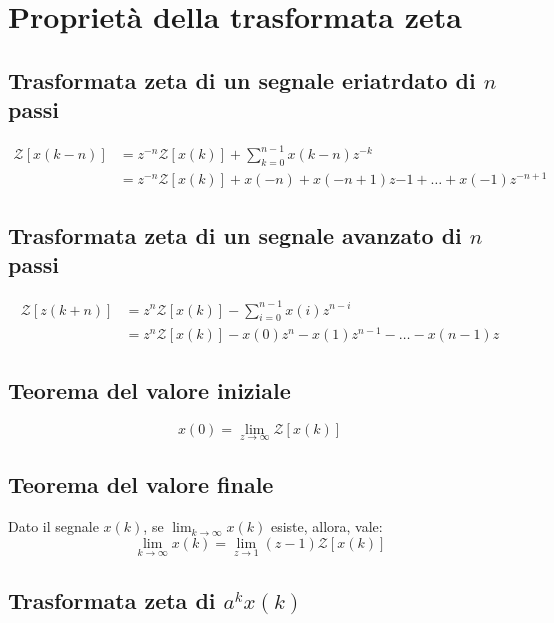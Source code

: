 \section{Proprietà della trasformata zeta}


\subsection{Trasformata zeta di un segnale eriatrdato di $n$ passi}

\begin{align}
  \mathcal{Z}[x(k - n)] &= z^{-n} \mathcal{Z}[x(k)] + \sum_{k=0}^{n-1} x(k-n) z^{-k} \\
  &= z^{-n} \mathcal{Z}[x(k)] + x(-n) + x(-n+1) z{-1} + \dots + x(-1) z^{-n+1}
\end{align}

\subsection{Trasformata zeta di un segnale avanzato di $n$ passi}

\begin{align}
  \mathcal{Z}[z(k + n)] &= z^{n} \mathcal{Z}[x(k)] - \sum_{i=0}^{n-1} x(i) z^{n-i} \\
  &= z^n \mathcal{Z}[x(k)] - x(0) z^n - x(1) z^{n-1} - \dots - x(n-1) z
\end{align}

\subsection{Teorema del valore iniziale}
\begin{equation}
  x(0) = \lim_{z \to \infty} \mathcal{Z}[x(k)]
\end{equation}


\subsection{Teorema del valore finale}
Dato il segnale $x(k)$, se $\lim_{k \to \infty} x(k)$ esiste, allora, vale:
\begin{equation}
  \lim_{k \to \infty} x(k) = \lim_{z \to 1} (z - 1) \mathcal{Z} [x(k)]
\end{equation}

\subsection{Trasformata zeta di $a^k x(k)$}

